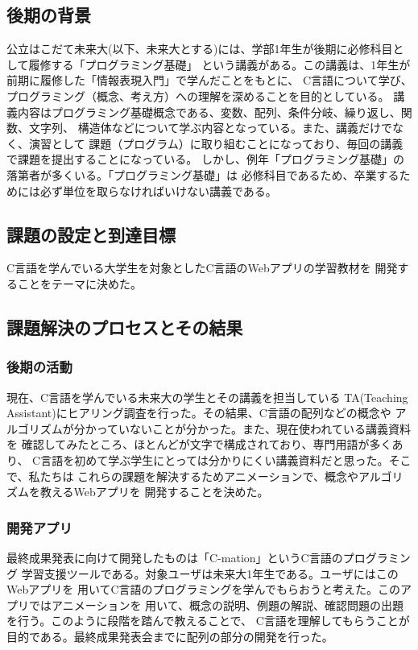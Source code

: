 \documentclass[twocolumn,draft]{jsarticle}
\begin{document}
\subsection{後期の背景}
\begin{hissu}
公立はこだて未来大(以下、未来大とする)には、学部1年生が後期に必修科目として履修する「プログラミング基礎」
という講義がある。この講義は、1年生が前期に履修した「情報表現入門」で学んだことをもとに、
C言語について学び、プログラミング（概念、考え方）への理解を深めることを目的としている。
講義内容はプログラミング基礎概念である、変数、配列、条件分岐、繰り返し、関数、文字列、
構造体などについて学ぶ内容となっている。また、講義だけでなく、演習として
課題（プログラム）に取り組むことになっており、毎回の講義で課題を提出することになっている。
しかし、例年「プログラミング基礎」の落第者が多くいる。「プログラミング基礎」は
必修科目であるため、卒業するためには必ず単位を取らなければいけない講義である。
\end{hissu}

\subsection{課題の設定と到達目標}
\begin{hissu}
C言語を学んでいる大学生を対象としたC言語のWebアプリの学習教材を
開発することをテーマに決めた。
\end{hissu}

\subsection{課題解決のプロセスとその結果}
\subsubsection{後期の活動}
\begin{hissu}
現在、C言語を学んでいる未来大の学生とその講義を担当している
TA(Teaching Assistant)にヒアリング調査を行った。その結果、C言語の配列などの概念や
アルゴリズムが分かっていないことが分かった。また、現在使われている講義資料を
確認してみたところ、ほとんどが文字で構成されており、専門用語が多くあり、
C言語を初めて学ぶ学生にとっては分かりにくい講義資料だと思った。そこで、私たちは
これらの課題を解決するためアニメーションで、概念やアルゴリズムを教えるWebアプリを
開発することを決めた。
\end{hissu}

\subsubsection{開発アプリ}
\begin{hissu}
最終成果発表に向けて開発したものは「C-mation」というC言語のプログラミング
学習支援ツールである。対象ユーザは未来大1年生である。ユーザにはこのWebアプリを
用いてC言語のプログラミングを学んでもらおうと考えた。このアプリではアニメーションを
用いて、概念の説明、例題の解説、確認問題の出題を行う。このように段階を踏んで教えることで、
C言語を理解してもらうことが目的である。最終成果発表会までに配列の部分の開発を行った。

\end{hissu}
\end{document}
